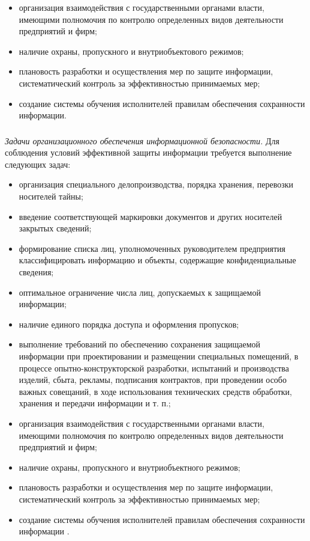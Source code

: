 \begin{itemize}
	\item организация взаимодействия с государственными органами власти, имеющими полномочия по контролю определенных видов деятельности предприятий и фирм;
	\item наличие охраны, пропускного и внутриобъектового режимов;
	\item плановость разработки и осуществления мер по защите информации, систематический контроль за эффективностью принимаемых мер;
	\item создание системы обучения исполнителей правилам обеспечения сохранности информации.
\end{itemize}


\subsubsection{}
\label{subsubsec:measures:organisational:tasks}

\textit{Задачи организационного обеспечения информационной безопасности.} Для соблюдения условий эффективной защиты информации требуется выполнение следующих задач:
\begin{itemize}
	\item организация специального делопроизводства, порядка хранения, перевозки носителей тайны;
	\item введение соответствующей маркировки документов и других носителей закрытых сведений;
	\item формирование списка лиц, уполномоченных руководителем предприятия классифицировать информацию и объекты, содержащие конфиденциальные сведения;
	\item оптимальное ограничение числа лиц, допускаемых к защищаемой информации;
	\item наличие единого порядка доступа и оформления пропусков;
	\item выполнение требований по обеспечению сохранения защищаемой информации при проектировании и размещении специальных помещений, в процессе опытно-конструкторской разработки, испытаний и производства изделий, сбыта, рекламы, подписания контрактов, при проведении особо важных совещаний, в ходе использования технических средств обработки, хранения и передачи информации и т. п.;
	\item организация взаимодействия с государственными органами власти, имеющими полномочия по контролю определенных видов деятельности предприятий и фирм;
	\item наличие охраны, пропускного и внутриобъектного режимов;
	\item плановость разработки и осуществления мер по защите информации, систематический контроль за эффективностью принимаемых мер;
	\item создание системы обучения исполнителей правилам обеспечения сохранности информации \cite{vostrezova_ural}.
\end{itemize}

